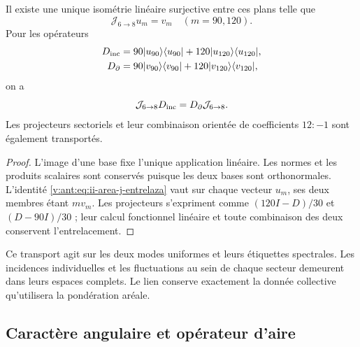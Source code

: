 \begin{theorem}
\label{v:ant:thm:ii-area-entrelazamiento-colectivo}
Il existe une unique isométrie linéaire surjective entre ces plans telle que
\begin{equation}
 \mathcal J_{6\to8}u_m=v_m\quad(m=90,120).
 \label{v:ant:eq:ii-area-j-colectivo}
\end{equation}
Pour les opérateurs
\[
 \begin{aligned}
 D_{\rm inc}&=90|u_{90}\rangle\langle u_{90}|
             +120|u_{120}\rangle\langle u_{120}|,\\
 D_\partial&=90|v_{90}\rangle\langle v_{90}|
             +120|v_{120}\rangle\langle v_{120}|,
 \end{aligned}
\]
on a
\begin{equation}
 \mathcal J_{6\to8}D_{\rm inc}
 =D_\partial\mathcal J_{6\to8}.
 \label{v:ant:eq:ii-area-j-entrelaza}
\end{equation}
Les projecteurs sectoriels et leur combinaison orientée de coefficients
\(12:-1\) sont également transportés.
\end{theorem}
\begin{proof}
L'image d'une base fixe l'unique application linéaire. Les normes et les
produits scalaires sont conservés puisque les deux bases sont orthonormales.
L'identité \eqref{v:ant:eq:ii-area-j-entrelaza} vaut sur chaque vecteur
\(u_m\), ses deux membres étant \(m v_m\). Les projecteurs
s'expriment comme \((120I-D)/30\) et \((D-90I)/30\) ; leur calcul fonctionnel
linéaire et toute combinaison des deux conservent l'entrelacement.
\end{proof}

Ce transport agit sur les deux modes uniformes et leurs étiquettes
spectrales. Les incidences individuelles et les fluctuations au sein de
chaque secteur demeurent dans leurs espaces complets. Le lien conserve
exactement la donnée collective qu'utilisera la pondération aréale.

\subsection{Caractère angulaire et opérateur d'aire}
\label{v:ant:sec:ii-area-caracter}

